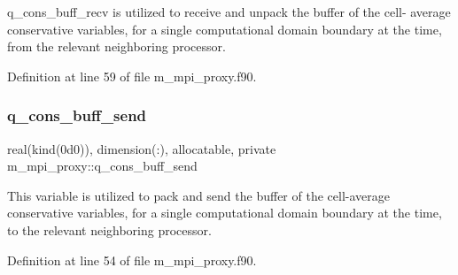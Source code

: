 q\+\_\+cons\+\_\+buff\+\_\+recv is utilized to receive and unpack the buffer of the cell-\/ average conservative variables, for a single computational domain boundary at the time, from the relevant neighboring processor. 



Definition at line 59 of file m\+\_\+mpi\+\_\+proxy.\+f90.

\mbox{\label{namespacem__mpi__proxy_a67f9b5b69858f72c61b8d8ebf212567d}} 
\subsubsection{\texorpdfstring{q\+\_\+cons\+\_\+buff\+\_\+send}{q\_cons\_buff\_send}}
{\footnotesize\ttfamily real(kind(0d0)), dimension(\+:), allocatable, private m\+\_\+mpi\+\_\+proxy\+::q\+\_\+cons\+\_\+buff\+\_\+send\hspace{0.3cm}{\ttfamily [private]}}



This variable is utilized to pack and send the buffer of the cell-\/average conservative variables, for a single computational domain boundary at the time, to the relevant neighboring processor. 



Definition at line 54 of file m\+\_\+mpi\+\_\+proxy.\+f90.

